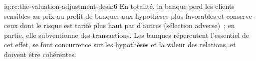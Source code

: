 \begin{solution}{iq:rc:the-valuation-adjustment-desk:6}
En totalité, la banque perd les clients sensibles au prix au profit de banques aux hypothèses plus favorables et conserve
ceux dont le risque est tarifé plus haut par d'autres (sélection adverse)~; en partie, elle subventionne des transactions. Les banques
répercutent l'essentiel de cet effet, se font concurrence sur les hypothèses et la valeur des relations, et doivent être cohérentes.
\end{solution}
